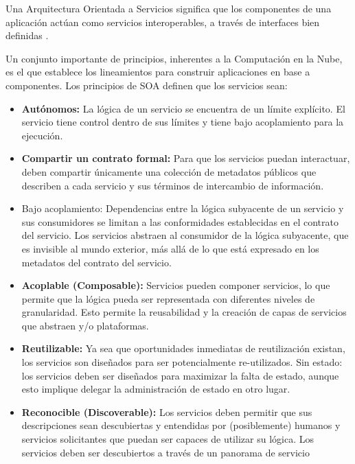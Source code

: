         Una Arquitectura Orientada a Servicios significa que los componentes de una aplicación actúan como servicios interoperables, a través de interfaces bien definidas \cite{Fox2013-ct}.
        
        Un conjunto importante de principios, inherentes a la Computación en la Nube, es el que establece los lineamientos para construir aplicaciones en base a componentes. Los principios de SOA definen que los servicios sean:
        \begin{itemize}
            \item \textbf{Autónomos: }La lógica de un servicio se encuentra de un límite explícito. El servicio tiene control dentro de sus límites y tiene bajo acoplamiento para la ejecución. 
            \item \textbf{Compartir un contrato formal: }Para que los servicios puedan interactuar, deben compartir únicamente una colección de metadatos públicos que describen a cada servicio y sus términos de intercambio de información.
            \item Bajo acoplamiento: Dependencias entre la lógica subyacente de un servicio y sus consumidores se limitan a las conformidades establecidas en el contrato del servicio. Los servicios abstraen al consumidor de la lógica subyacente, que es invisible al mundo exterior, más allá de lo que está expresado en los metadatos del contrato del servicio.
            \item \textbf{Acoplable (Composable):} Servicios pueden componer servicios, lo que permite que la lógica pueda ser representada con diferentes niveles de granularidad. Esto permite la reusabilidad y la creación de capas de servicios que abstraen y/o plataformas.
            \item \textbf{Reutilizable: }Ya sea que oportunidades inmediatas de reutilización existan, los servicios son diseñados para ser potencialmente re-utilizados.
            Sin estado: los servicios deben ser diseñados para maximizar la falta de estado, aunque esto implique delegar la administración de estado en otro lugar.
            \item \textbf{Reconocible (Discoverable): }Los servicios deben permitir que sus descripciones sean descubiertas y entendidas por (posiblemente) humanos y servicios solicitantes que puedan ser capaces de utilizar su lógica. Los servicios deben ser descubiertos a través de un panorama de servicio
        \end{itemize}
        
